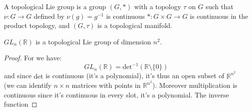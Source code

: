\documentclass{article}                                                        %
\begin{document}
    \begin{definition}
        A topological Lie group is a group $(G,*)$ with a topology $\tau$ on
        $G$ such that $\nu:G\rightarrow{G}$ defined by
        $\nu(g)=g^{\minus{1}}$ is continuous $*:G\times{G}\rightarrow{G}$ is
        continuous in the product topology, and $(G,\tau)$ is a topological
        manifold.
    \end{definition}
    \begin{theorem}
        $GL_{n}(\mathbb{R})$ is a topological Lie group of dimension
        $n^{2}$.
    \end{theorem}
    \begin{proof}
        For we have:
        \begin{equation}
            GL_{n}(\mathbb{R})=
            \textrm{det}^{\minus{1}}(\mathbb{R}\setminus\{0\})
        \end{equation}
        and since $\textrm{det}$ is continuous (it's a polynomial), it's
        thus an open subset of $\mathbb{R}^{n^{2}}$ (we can identify
        $n\times{n}$ matrices with points in $\mathbb{R}^{n^{2}}$). Moreover
        multiplication is continuous since it's continuous in every slot,
        it's a polynomial. The inverse function
    \end{proof}
\end{document}
